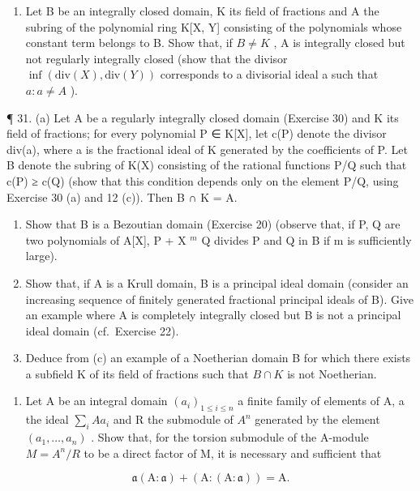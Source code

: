 \begin{enumerate}
\def\labelenumi{(\alph{enumi})}
\setcounter{enumi}{3}
\tightlist
\item
  Let B be an integrally closed domain, K its field of fractions and A the subring of the polynomial ring K{[}X, Y{]} consisting of the polynomials whose constant term belongs to B. Show that, if \(B \neq K\) , A is integrally closed but not regularly integrally closed (show that the divisor \(\inf(\text{div}(X), \text{div}(Y))\) corresponds to a divisorial ideal a such that \(a: a \neq A\) ).
\end{enumerate}

¶ 31. (a) Let A be a regularly integrally closed domain (Exercise 30) and K its field of fractions; for every polynomial P ∈ K{[}X{]}, let c(P) denote the divisor div(a), where a is the fractional ideal of K generated by the coefficients of P. Let B denote the subring of K(X) consisting of the rational functions P/Q such that c(P) ≥ c(Q) (show that this condition depends only on the element P/Q, using Exercise 30 (a) and 12 (c)). Then B ∩ K = A.

\begin{enumerate}
\def\labelenumi{(\alph{enumi})}
\setcounter{enumi}{1}
\item
  Show that B is a Bezoutian domain (Exercise 20) (observe that, if P, Q are two polynomials of A{[}X{]}, P + X \(^{m}\) Q divides P and Q in B if m is sufficiently large).
\item
  Show that, if A is a Krull domain, B is a principal ideal domain (consider an increasing sequence of finitely generated fractional principal ideals of B). Give an example where A is completely integrally closed but B is not a principal ideal domain (cf.~Exercise 22).
\item
  Deduce from (c) an example of a Noetherian domain B for which there exists a subfield K of its field of fractions such that \(B \cap K\) is not Noetherian.
\end{enumerate}

\begin{enumerate}
\def\labelenumi{\arabic{enumi}.}
\setcounter{enumi}{31}
\tightlist
\item
  Let A be an integral domain \((a_{i})_{1 \leqslant i \leqslant n}\) a finite family of elements of A, a the ideal \(\sum_{i} A a_{i}\) and R the submodule of \(A^{n}\) generated by the element \((a_{1}, \ldots, a_{n})\) . Show that, for the torsion submodule of the A-module \(M = A^{n}/R\) to be a direct factor of M, it is necessary and sufficient that
\end{enumerate}

\[
\mathfrak {a} (\mathrm{A}: \mathfrak {a}) + (\mathrm{A}: (\mathrm{A}: \mathfrak {a})) = \mathrm{A}.
\]

